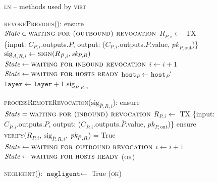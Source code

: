 \begin{figure}[H]
  \begin{processbox}{\textsc{ln} -- methods used by \textsc{virt}}
    \begin{algorithmic}[1]
      \State \textsc{revokePrevious}():
      \label{code:ln:methods-for-virt:revoke-previous}
      \Indent
        \State ensure $\itistate \in \textsc{waiting for (outbound)
        revocation}$
        \State $R_{\bar{P}, i} \gets$ TX \{input: $C_{P, i}$.outputs.$P$,
        output: ($C_{P, i}$.outputs.$P$.value, $pk_{\bar{P}, \mathrm{out}}$)\}
        \State $\mathrm{sig}_{A, R, i} \gets \textsc{sign}(R_{\bar{P}, i},
        \textit{sk}_{P, R})$
          \State $\itistate \gets \textsc{waiting for inbound revocation}$
        \Else \: 
          \State $i \gets i + 1$
          \State $\itistate \gets \textsc{waiting for hosts ready}$
        \EndIf
        \State $\texttt{host}_P \gets \texttt{host}_P'$ 
        \State $\texttt{layer} \gets \texttt{layer} + 1$
        \label{code:ln:methods-for-virt:host-update}
        \State \Return $\mathrm{sig}_{P, R, i}$
      \EndIndent
      \Statex

      \State \textsc{processRemoteRevocation}($\mathrm{sig}_{\bar{P}, R, i}$):
      \label{code:ln:methods-for-virt:process-remote-revocation}
      \Indent
        \State ensure $\itistate = \textsc{waiting for (inbound)
        revocation}$
        \State $R_{P, i} \gets$ TX \{input: $C_{\bar{P}, i}$.outputs.$P$,
        output: ($C_{\bar{P}, i}$.outputs.$\bar{P}$.value, $pk_{P,
        \mathrm{out}}$)\}
        \State ensure \textsc{verify}($R_{P, i}$, $\mathrm{sig}_{\bar{P}, R,
        i}$, $\textit{pk}_{\bar{P}, R}$) = True
          \State $\itistate \gets \textsc{waiting for outbound
          revocation}$
        \Else \: 
          \State $i \gets i + 1$
          \State $\itistate \gets \textsc{waiting for hosts ready}$
        \EndIf
        \State \Return (\textsc{ok})
      \EndIndent
      \Statex

      \State \textsc{negligent}():
      \Indent
        \State $\texttt{negligent} \gets$ True
        \label{code:ln:methods-for-virt:negligent}
        \State \Return (\textsc{ok})
      \EndIndent
    \end{algorithmic}
  \end{processbox}
  \caption{}
  \label{code:ln:methods-for-virt}
\end{figure}

